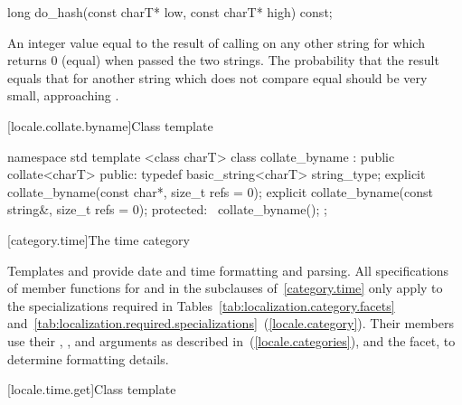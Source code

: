 %
%
\begin{itemdecl}
long do_hash(const charT* low, const charT* high) const;
\end{itemdecl}

\begin{itemdescr}
\pnum
\returns
An integer value equal to the result of calling
on any other string for which
returns 0 (equal) when passed the two strings.
\enternote
The probability that the result equals that for another string which does
not compare equal should be very small, approaching
.
\exitnote
\end{itemdescr}

[locale.collate.byname]{Class template }

%
\begin{codeblock}
namespace std {
  template <class charT>
  class collate_byname : public collate<charT> {
  public:
    typedef basic_string<charT> string_type;
    explicit collate_byname(const char*, size_t refs = 0);
    explicit collate_byname(const string&, size_t refs = 0);
  protected:
    ~collate_byname();
  };
}
\end{codeblock}

[category.time]{The time category}

\pnum
Templates
and
provide date and time formatting and parsing.
All specifications of member functions for
and
in the subclauses of~\ref{category.time} only apply to the
specializations required in Tables~\ref{tab:localization.category.facets}
and~\ref{tab:localization.required.specializations}~(\ref{locale.category}).
Their members use their
,
,
and
arguments as described in~(\ref{locale.categories}), and the
facet, to determine formatting details.

[locale.time.get]{Class template }

